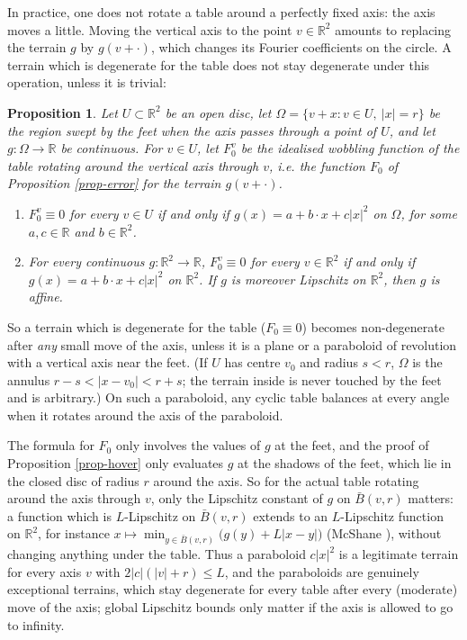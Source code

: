 \documentclass[a4paper,11pt,twoside,leqno]{article}
\newtheorem{prop}[teo]{Proposition}
\newcommand{\ie}[0]{\emph{i.e.} }
\newcommand{\rr}[0]{\ensuremath{\mathbb{R}}}
\numberwithin{equation}{section}
\begin{document}
In practice, one does not rotate a table around a perfectly fixed axis: the axis moves a little. Moving the vertical axis to the point $v \in \rr^2$ amounts to replacing the terrain $g$ by $g(v + \cdot)$, which changes its Fourier coefficients on the circle. A terrain which is degenerate for the table does not stay degenerate under this operation, unless it is trivial:

\begin{prop}\label{prop-axis}
Let $U \subset \rr^2$ be an open disc, let $\Omega = \{v + x : v \in U,\ |x| = r\}$ be the region swept by the feet when the axis passes through a point of $U$, and let $g : \Omega \to \rr$ be continuous. For $v \in U$, let $F_0^v$ be the idealised wobbling function of the table rotating around the vertical axis through $v$, \ie the function $F_0$ of Proposition \ref{prop-error} for the terrain $g(v + \cdot)$.
\begin{enumerate}\renewcommand{\theenumi}{\bfseries (\alph{enumi})}
 \item $F_0^v \equiv 0$ for every $v \in U$ if and only if $g(x) = a + b \cdot x + c|x|^2$ on $\Omega$, for some $a, c \in \rr$ and $b \in \rr^2$.
 \item For every continuous $g : \rr^2 \to \rr$, $F_0^v \equiv 0$ for every $v \in \rr^2$ if and only if $g(x) = a + b \cdot x + c|x|^2$ on $\rr^2$. If $g$ is moreover Lipschitz on $\rr^2$, then $g$ is affine.
\end{enumerate}
\end{prop}

So a terrain which is degenerate for the table ($F_0 \equiv 0$) becomes non-degenerate after \emph{any} small move of the axis, unless it is a plane or a paraboloid of revolution with a vertical axis near the feet. (If $U$ has centre $v_0$ and radius $s < r$, $\Omega$ is the annulus $r - s < |x - v_0| < r + s$; the terrain inside is never touched by the feet and is arbitrary.) On such a paraboloid, any cyclic table balances at every angle when it rotates around the axis of the paraboloid.

The formula for $F_0$ only involves the values of $g$ at the feet, and the proof of Proposition \ref{prop-hover} only evaluates $g$ at the shadows of the feet, which lie in the closed disc of radius $r$ around the axis. So for the actual table rotating around the axis through $v$, only the Lipschitz constant of $g$ on $\bar B(v, r)$ matters: a function which is $L$-Lipschitz on $\bar B(v,r)$ extends to an $L$-Lipschitz function on $\rr^2$, for instance $x \mapsto \min_{y \in \bar B(v,r)} \big(g(y) + L|x - y|\big)$ (McShane \cite{McS}), without changing anything under the table. Thus a paraboloid $c|x|^2$ is a legitimate terrain for every axis $v$ with $2|c|(|v| + r) \leq L$, and the paraboloids are genuinely exceptional terrains, which stay degenerate for every table after every (moderate) move of the axis; global Lipschitz bounds only matter if the axis is allowed to go to infinity.
\end{document}
